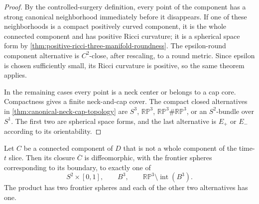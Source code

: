 \begin{proof}
By the controlled-surgery definition, every point of the component has a
strong canonical neighborhood immediately before it disappears.  If one of
these neighborhoods is a compact positively curved component, it is the
whole connected component and has positive Ricci curvature; it is a
spherical space form by
\ref{thm:positive-ricci-three-manifold-roundness}.  The epsilon-round
component alternative is $C^2$-close, after rescaling, to a round metric.
Since epsilon is chosen sufficiently small, its Ricci curvature is positive,
so the same theorem applies.

In the remaining cases every point is a neck center or belongs to a cap core.
Compactness gives a finite neck-and-cap cover.  The compact closed
alternatives in \ref{thm:canonical-neck-cap-topology} are $S^3$,
$\mathbb{RP}^3$, $\mathbb{RP}^3\#\mathbb{RP}^3$, or an $S^2$-bundle over
$S^1$.  The first two are spherical space forms, and the last alternative is
$E_+$ or $E_-$ according to its orientability.
\end{proof}

\begin{lemma}
\label{lem:frontier-disappearing-component-classification}
\notready
Let $C$ be a connected component of $D$ that is not a whole component of the
time-$t$ slice.  Then its closure $\overline C$ is diffeomorphic, with the
frontier spheres corresponding to its boundary, to exactly one of
\[
 S^2\times[0,1],\qquad B^3,
 \qquad \mathbb{RP}^3\setminus\operatorname{int}(B^3).
\]
The product has two frontier spheres and each of the other two alternatives
has one.
\end{lemma}

